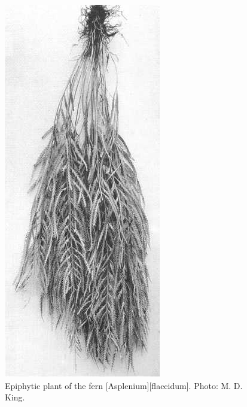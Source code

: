 \begin{figure}[!htb]
\begin{minipage}[t]{0.553\textwidth}
	\end{minipage}\hfill%
	\begin{minipage}[t]{0.427\textwidth}
    	\centering
    	\includegraphics[width=\textwidth]{graphics/figure43asplenium-jlaccidum.jpg}
    	\caption[Epiphytic plant of the fern \emph{Asplenium flaccidum}]{Epiphytic plant of the fern [Asplenium][flaccidum].
    	Photo: M. D. King.}%
    	\label{fig:43asplenium-jlaccidum}
	\end{minipage}
\end{figure}


